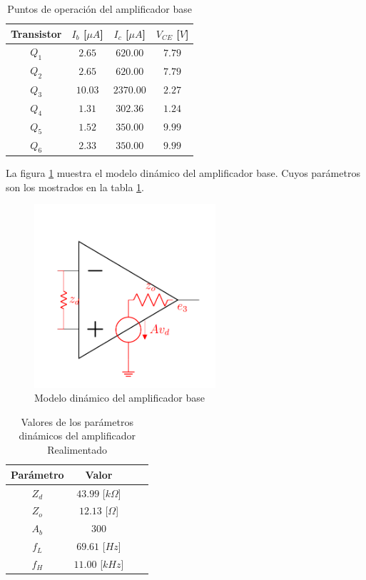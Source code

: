 \documentclass{article}
\begin{document}
\begin{table}[ht]
\centering
\begin{tabular}{|c|c|c|c|}
        \hline
        \textbf{Transistor} & $I_b$ [$\mu A$] & $I_c$ [$\mu A$] & $V_{CE}$ [$V$] \\ \hline
        $Q_1$ & $2.65$ & $620.00 $ & $7.79$ \\ \hline
        $Q_2$ & $2.65$ & $620.00 $ & $7.79$ \\ \hline
        $Q_3$ & $10.03$ & $2370.00 $ & $2.27$ \\ \hline
        $Q_4$ & $1.31$ & $302.36$ & $1.24$ \\ \hline
        $Q_5$ & $1.52 $ & $350.00$ & $9.99$ \\ \hline
        $Q_6$ & $2.33 $ & $350.00$ & $9.99$ \\ \hline
\end{tabular}
\caption{Puntos de operación del amplificador base}
\end{table}

La figura \ref{fig:amplificador-base} muestra el modelo dinámico del amplificador base. Cuyos parámetros son los mostrados en la tabla \ref{tab:amplificador-base-dinamico}.

\begin{figure}[ht]
    \centering
    \includegraphics[width=0.6\textwidth]{src/images/modelo-amplificador.png}
    \caption{Modelo dinámico del amplificador base}
    \label{fig:amplificador-base}
\end{figure}

\begin{table}[ht]
    \centering
    \label{tab:amplificador-base-dinamico}
    \begin{tabular}{|c|c|c|c|}
        \hline
        \textbf{Parámetro} & \textbf{Valor} \\ \hline
        $Z_d$ & $43.99$ [$k\Omega$] \\ \hline
        $Z_o$ & $12.13 $ [$\Omega$] \\ \hline
        $A_b$ & $300$ \\ \hline
        $f_L$ & $69.61$ [$Hz$] \\ \hline
        $f_H$ & $11.00$ [$kHz$] \\ \hline
    \end{tabular}
    \caption{Valores de los parámetros dinámicos del amplificador Realimentado}

\end{table}
\end{document}
